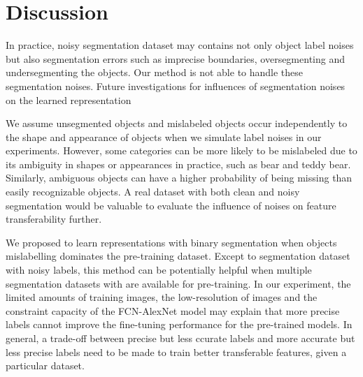 \section{Discussion}
\label{sec:discussion}



In practice, noisy segmentation dataset may contains not only object label noises but also segmentation errors such as imprecise boundaries, oversegmenting and undersegmenting the objects.
Our method is not able to handle these segmentation noises.
Future investigations for influences of segmentation noises on the learned representation


We assume unsegmented objects and mislabeled objects occur independently to the shape and appearance of objects when we simulate label noises in our experiments.
However, some categories can be more likely to be mislabeled due to its ambiguity in shapes or appearances in practice, such as bear and teddy bear.
Similarly,  ambiguous objects can have a higher probability of being missing than easily recognizable objects.
A real dataset with both clean and noisy segmentation would be valuable to evaluate the influence of noises on feature transferability further.



We proposed to learn representations with binary segmentation when objects mislabelling dominates the pre-training dataset.
Except to segmentation dataset with noisy labels, this method can be potentially helpful when multiple segmentation datasets with are available for pre-training.
In our experiment, the limited amounts of training images, the low-resolution of images and the constraint capacity of the FCN-AlexNet model may explain that more precise labels cannot improve the fine-tuning performance for the pre-trained models.
In general, a trade-off between precise but less ccurate labels and more accurate but less precise labels need to be made to train better transferable features, given a particular dataset.




